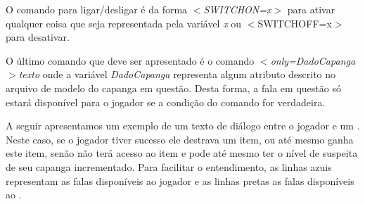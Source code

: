 O comando para ligar/desligar é da forma \emph{$<$SWITCHON=x$>$} para ativar qualquer coisa que seja representada pela variável \emph{x} ou {$<$SWITCHOFF=x$>$} para desativar.

O último comando que deve ser apresentado é o comando \emph{$<$only=DadoCapanga$>$texto} onde a variável \emph{DadoCapanga} representa algum atributo descrito no arquivo de modelo do capanga em questão. Desta forma, a fala em questão só estará disponível para o jogador se a condição do comando for verdadeira.

A seguir apresentamos um exemplo de um texto de diálogo entre o jogador e um \npc{}. Neste caso, se o jogador tiver sucesso ele destrava um item, ou até mesmo ganha este item, senão não terá acesso ao item e pode até mesmo ter o nível de suspeita de seu capanga incrementado.
Para facilitar o entendimento, as linhas azuis representam as falas disponíveis ao jogador e as linhas pretas as falas disponíveis ao \npc{}.

